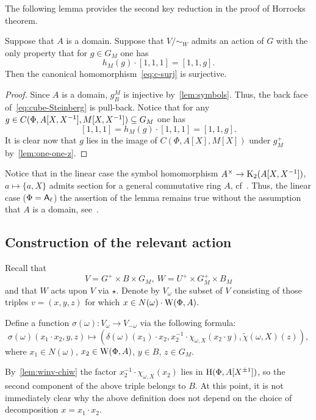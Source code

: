 The following lemma provides the second key reduction in the proof of Horrocks theorem.
\begin{lemma}
    Suppose that $A$ is a domain.
    Suppose that $V/\sim_W$ admits an action of $G$ with the only property that
      for $g \in G_M$ one has \[ h_M(g) \cdot [1, 1, 1] = [1, 1, g]. \]
    Then the canonical homomorphism~\eqref{eq:c-surj} is surjective.
\end{lemma}
\begin{proof}
  Since $A$ is a domain, $g^M_B$ is injective by~\cref{lem:symbols}.
    Thus, the back face of~\eqref{eq:cube-Steinberg} is pull-back.
  Notice that for any $g \in C(\Phi, A[X, X^{-1}], M[X, X^{-1}]) \subseteq G_M$ one has
    \[ [1, 1, 1] = h_M(g) \cdot [1, 1, 1] = [1, 1, g].\]
  It is clear now that $g$ lies in the image of $C(\Phi, A[X], M[X])$ under $g^+_M$ by~\cref{lem:one-one-z}.
\end{proof}

\begin{rem}
    Notice that in the linear case the symbol homomorphism $A^\times \to \operatorname{K}_2(A[X, X^{-1}])$, $a \mapsto \{a, X\}$ admits section
     for a general commutative ring $A$, cf~\cite{Wa71}.
    Thus, the linear case ($\Phi = \mathsf{A}_\ell$) the assertion of the lemma remains true without the assumption that $A$ is a domain, see~\cite[Lemma~3.1g]{Tu83}.
\end{rem}

\subsection{Construction of the relevant action} \label{sec:construction-delta}
Recall that \[V = G^+ \times B \times G_M,\ W = U^+ \times G_M^+ \times B_M\]
and that $W$ acts upon $V$ via $\star$.
Denote by $V_\omega$ the subset of $V$ consisting of those triples $v = (x, y, z)$ for which $x \in N(\omega)\cdot \operatorname{W}(\Phi, A)$.


\begin{dfn} \label{sigma-def}
  Define a function $\sigma(\omega) \colon V_\omega \to V_{-\omega}$ via the following formula:
  \begin{equation} \label{eq:sigma-def} \sigma(\omega)(x_1 \cdot x_2, y, z) \mapsto (\delta(\omega)(x_1)\cdot x_2, x_2^{-1} \cdot \chi_{\omega, X}(x_2 \cdot y), \widetilde{\chi}(\omega, X)(z)), \end{equation}
  where $x_1 \in N(\omega)$, $x_2 \in \operatorname{W}(\Phi, A)$,  $y \in B$, $z \in G_M$.

  By~\cref{lem:winv-chiw} the factor $x_2^{-1} \cdot \chi_{\omega, X}(x_2)$ lies in $\operatorname{H}(\Phi, A[X^{\pm 1}])$, so the second component of the above triple belongs to $B$. At this point, it is not immediately clear why the above definition does not depend on the choice of decomposition $x = x_1 \cdot x_2$.
\end{dfn}


